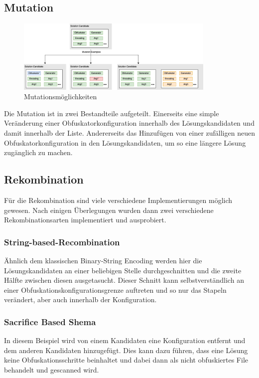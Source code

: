 \subsection{Mutation}
\begin{figure}[h]
    \centering
    \includegraphics[width=0.85\textwidth]{gfx/Abbildungen/Mutations.png}
    \caption{Mutationsmöglichkeiten}
    \label{fig:mutations}
\end{figure}
Die Mutation ist in zwei Bestandteile aufgeteilt. Einerseits eine simple Veränderung einer Obfuskatorkonfiguration innerhalb des Lösungskandidaten und damit innerhalb der Liste. Andererseits das Hinzufügen von einer zufälligen neuen Obfuskatorkonfiguration in den Lösungskandidaten, um so eine längere Lösung zugänglich zu machen.


\subsection{Rekombination}
Für die Rekombination sind viele verschiedene Implementierungen möglich gewesen. Nach einigen Überlegungen wurden dann zwei verschiedene Rekombinationsarten implementiert und ausprobiert.
\subsubsection{String-based-Recombination}
Ähnlich dem klassischen Binary-String Encoding werden hier die Lösungskandidaten an einer beliebigen Stelle durchgeschnitten und die zweite Hälfte zwischen diesen ausgetasucht. Dieser Schnitt kann selbstverständlich an einer Obfuskationskonfigurationsgrenze auftreten und so nur das Stapeln verändert, aber auch innerhalb der Konfiguration.
\subsubsection{Sacrifice Based Shema}
In diesem Beispiel wird von einem Kandidaten eine Konfiguration entfernt und dem anderen Kandidaten hinzugefügt. Dies kann dazu führen, dass eine Lösung keine Obfuskationsschritte beinhaltet und dabei dann als nicht obfuskiertes File behandelt und gescanned wird.




